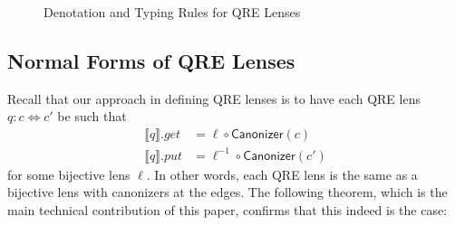 \documentclass[acmsmall,review,anonymous]{acmart}
\newcommand{\kw}[1]{\ensuremath{\mathsf{#1}}}
\newcommand{\canonizer}{\ensuremath{\kw{Canonizer}}}
\begin{document}
\begin{figure}[ht]
\caption{Denotation and Typing Rules for QRE Lenses}
\label{fig:qlenssemantics}
\end{figure}

\subsection{Normal Forms of QRE Lenses}
Recall that our approach in defining QRE lenses is to have each QRE lens $q: c
\Leftrightarrow c'$ be such that
\begin{align*}
\llbracket q \rrbracket.get &= \ell \circ \canonizer(c)\\
\llbracket q \rrbracket.put &= \ell^{-1} \circ
\canonizer(c')
\end{align*}
for some bijective lens $\ell$. In other words, each QRE lens is the same as a
bijective lens with canonizers at the edges. The following theorem,
which is the main technical contribution of this paper, confirms that this
indeed is the case:
\end{document}
